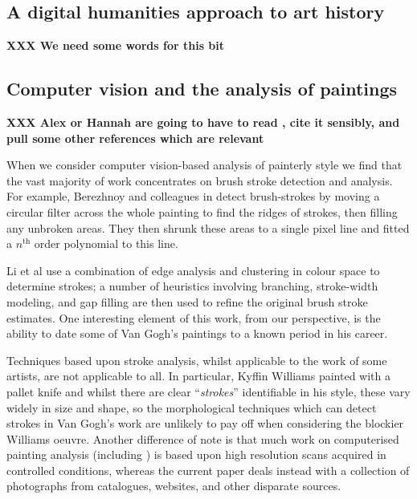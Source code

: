 \documentclass[conference,a4paper]{IEEEtran}
\begin{document}

\subsection{A digital humanities approach to art history}

\textbf{XXX We need some words for this bit}

\subsection{Computer vision and the analysis of paintings}


\textbf{XXX Alex or Hannah are going to have to read \cite{Stork2009Computer}, cite it sensibly, and pull some other references which are relevant}

When we consider computer vision-based analysis of painterly style we find that
the vast majority of  work concentrates on brush stroke detection and analysis.
For example, Berezhnoy and colleagues in \cite{Berezhnoy2009Automatic} detect
brush-strokes by moving a circular filter across the whole painting to find the
ridges of strokes, then filling any unbroken areas. They then shrunk these
areas to a single pixel line and fitted a $n^{\text{th}}$ order polynomial to
this line.

Li et al \cite{Li2012Rhythmic} use a combination of edge analysis and
clustering in colour space to determine strokes; a number of heuristics
involving branching, stroke-width modeling, and gap filling are then used to
refine the original brush stroke estimates. One interesting element of this
work, from our perspective, is the ability to date some of Van Gogh's paintings
to a known period in his career.

Techniques based upon stroke analysis, whilst applicable to the work of some
artists, are not applicable to all. In particular, Kyffin Williams painted with
a pallet knife and whilst there are clear ``\emph{strokes}'' identifiable in
his style, these vary widely in size and shape, so the morphological techniques
which can detect strokes in Van Gogh's work are unlikely to pay off when
considering the blockier Williams oeuvre. Another difference of note is that
much work on computerised painting analysis (including \cite{Li2012Rhythmic,
Berezhnoy2009Automatic}) is based upon high resolution scans acquired in
controlled conditions, whereas the current paper deals instead with a
collection of photographs from catalogues, websites, and other disparate
sources. 
\end{document}
